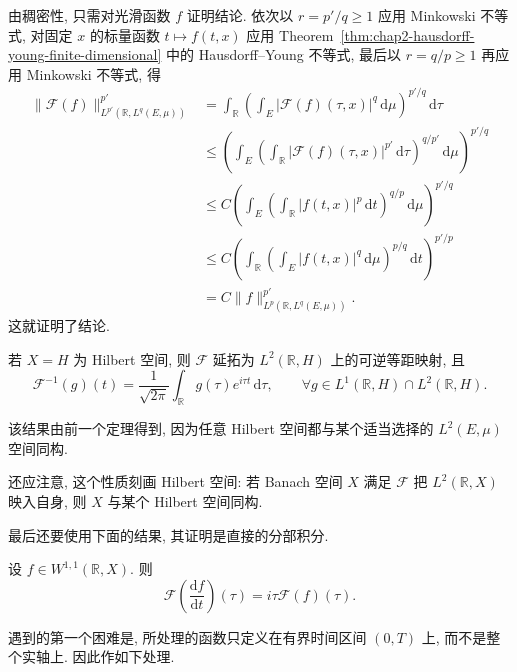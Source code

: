\begin{Proof}
由稠密性, 只需对光滑函数 $f$ 证明结论. 依次以 $r=p'/q\geq1$ 应用 Minkowski 不等式, 对固定 $x$ 的标量函数 $t\mapsto f(t,x)$ 应用 Theorem~\ref{thm:chap2-hausdorff-young-finite-dimensional} 中的 Hausdorff--Young 不等式, 最后以 $r=q/p\geq1$ 再应用 Minkowski 不等式, 得
\begin{align*}
 \|\mathcal{F}(f)\|_{L^{p'}(\mathbb{R},L^q(E,\mu))}^{p'}
 &=\int_\mathbb{R}
 \left(\int_E|\mathcal{F}(f)(\tau,x)|^q\,\mathrm{d}\mu\right)^{p'/q}
 \,\mathrm{d}\tau\\
 &\leq\left(
 \int_E\left(\int_\mathbb{R}|\mathcal{F}(f)(\tau,x)|^{p'}\,\mathrm{d}\tau\right)^{q/p'}
 \,\mathrm{d}\mu\right)^{p'/q}\\
 &\leq C\left(
 \int_E\left(\int_\mathbb{R}|f(t,x)|^p\,\mathrm{d}t\right)^{q/p}
 \,\mathrm{d}\mu\right)^{p'/q}\\
 &\leq C\left(
 \int_\mathbb{R}\left(\int_E|f(t,x)|^q\,\mathrm{d}\mu\right)^{p/q}
 \,\mathrm{d}t\right)^{p'/p}\\
 &=C\|f\|_{L^p(\mathbb{R},L^q(E,\mu))}^{p'}.
\end{align*}
这就证明了结论.
\end{Proof}

\begin{Corollary}
\label{cor:chap2-fourier-hilbert-isometry}
若 $X=H$ 为 Hilbert 空间, 则 $\mathcal{F}$ 延拓为 $L^2(\mathbb{R},H)$ 上的可逆等距映射, 且
\[
 \mathcal{F}^{-1}(g)(t)=\frac1{\sqrt{2\pi}}\int_\mathbb{R}g(\tau)e^{i\tau t}\,\mathrm{d}\tau,
 \qquad
 \forall g\in L^1(\mathbb{R},H)\cap L^2(\mathbb{R},H).
\]
\end{Corollary}

\begin{Proof}
该结果由前一个定理得到, 因为任意 Hilbert 空间都与某个适当选择的 $L^2(E,\mu)$ 空间同构.

还应注意, 这个性质刻画 Hilbert 空间: 若 Banach 空间 $X$ 满足 $\mathcal{F}$ 把 $L^2(\mathbb{R},X)$ 映入自身, 则 $X$ 与某个 Hilbert 空间同构.
\end{Proof}

最后还要使用下面的结果, 其证明是直接的分部积分.

\begin{Proposition}
\label{prop:chap2-fourier-time-derivative}
设 $f\in W^{1,1}(\mathbb{R},X)$. 则
\[
 \mathcal{F}\left(\frac{\mathrm{d}f}{\mathrm{d}t}\right)(\tau)
 =i\tau\mathcal{F}(f)(\tau).
\]
\end{Proposition}

遇到的第一个困难是, 所处理的函数只定义在有界时间区间 $(0,T)$ 上, 而不是整个实轴上. 因此作如下处理.

